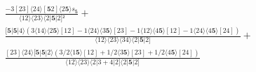 \documentclass[varwidth, border=5pt]{standalone}
\begin{document}
\begin{my}
$\begin{gathered}
\scriptscriptstyle\frac{-3[23]⟨24⟩[𝟓2]⟨2𝟓⟩s_{𝟓}}{⟨12⟩⟨23⟩⟨2|𝟓|2]²} +\\
\scriptscriptstyle\frac{[𝟓|𝟓|4⟩(3⟨14⟩⟨2𝟓⟩[12]-1⟨24⟩⟨3𝟓⟩[23]-1⟨12⟩⟨4𝟓⟩[12]-1⟨24⟩⟨4𝟓⟩[24])}{⟨12⟩⟨23⟩⟨34⟩⟨2|𝟓|2]} +\\
\scriptscriptstyle\frac{[23]⟨24⟩[𝟓|𝟓|2⟩(3/2⟨1𝟓⟩[12]+1/2⟨3𝟓⟩[23]+1/2⟨4𝟓⟩[24])}{⟨12⟩⟨23⟩⟨2|3+4|2]⟨2|𝟓|2]} \phantom{+}
\end{gathered}$
\end{my}
\end{document}
